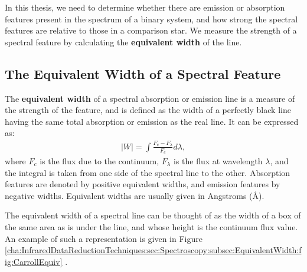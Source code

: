 \vspace{\myparskip}

In this thesis, we need to determine whether there are emission or absorption features present in the spectrum of a binary system, and how strong the spectral features are relative to those in a comparison star. We measure the strength of a spectral
feature by calculating the \textbf{equivalent width} of the line. %


\subsection{The Equivalent Width of a Spectral Feature}\label{cha:InfraredDataReductionTechniques:sec:Spectroscopy:subsec:EquivalentWidth}

The \textbf{equivalent width} of a spectral absorption or emission line is a measure of the strength
of the feature, and is defined as the width of a perfectly black line
having the same total absorption or emission as the real line. It can
be expressed as:
\begin{eqnarray}\label{cha:InfraredDataReductionTechniques:sec:Spectroscopy:subsec:EquivalentWidth:eqn:equiv}
|W| = \int \frac{F_c - F_{\lambda}}{F_c} d\lambda,
\end{eqnarray}
where $F_c$ is the flux due to the continuum, $F_{\lambda}$ is the
flux at wavelength $\lambda$, and the integral is taken from one side
of the spectral line to the other. Absorption features are denoted by
positive equivalent widths, and emission features by negative
widths. Equivalent widths are usually given in Angstroms (\AA). %

\vspace{\myparskip}

The equivalent width of a spectral line can be thought of as the width
of a box of the same area as is under the line, and whose height is the
continuum flux value. An example of such a representation is given in
Figure~%
\vref{cha:InfraredDataReductionTechniques:sec:Spectroscopy:subsec:EquivalentWidth:fig:CarrollEquiv}%
. %

